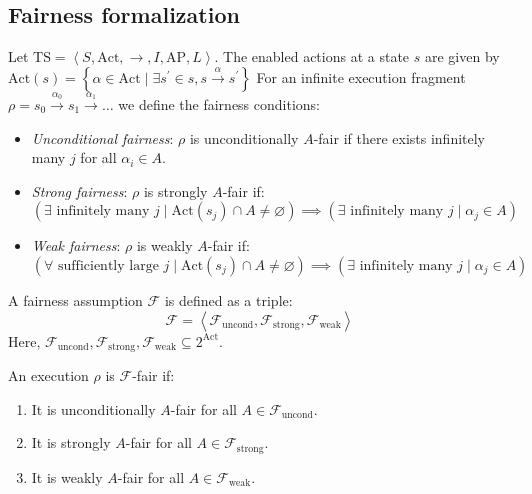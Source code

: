 \subsection{Fairness formalization}
\begin{definition}
    Let $\text{TS}=\left\langle S,\text{Act},\rightarrow,I,\text{AP},L\right\rangle$. 
    The enabled actions at a state $s$ are given by $\text{Act}(s)=\left\{\alpha\in\text{Act}\mid\exists s^\prime \in s, s\xrightarrow{\alpha}s^\prime\right\}$
    For an infinite execution fragment $\rho=s_0\xrightarrow{\alpha_0}s_1\xrightarrow{\alpha_1}\dots$ we define the fairness conditions:
    \begin{itemize}
        \item \textit{Unconditional fairness}: $\rho$ is unconditionally $A$-fair if there exists infinitely many $j$ for all $\alpha_i\in A$. 
        \item \textit{Strong fairness}: $\rho$ is strongly $A$-fair if: 
            \[\left(\exists \text{ infinitely many }j\mid\text{Act}(s_j)\cap A\neq\varnothing\right)\implies\left(\exists \text{ infinitely many }j\mid\alpha_j\in A\right)\]
        \item \textit{Weak fairness}: $\rho$ is weakly $A$-fair if: 
            \[\left(\forall \text{ sufficiently large }j\mid\text{Act}(s_j)\cap A\neq\varnothing\right)\implies\left(\exists \text{ infinitely many }j\mid\alpha_j\in A\right)\]
    \end{itemize}
\end{definition}
\begin{definition}
    A fairness assumption $\mathcal{F}$  is defined as a triple: 
    \[\mathcal{F}=\left\langle \mathcal{F}_{\text{uncond}},\mathcal{F}_{\text{strong}},\mathcal{F}_{\text{weak}}\right\rangle\] 
    Here, $\mathcal{F}_{\text{uncond}},\mathcal{F}_{\text{strong}},\mathcal{F}_{\text{weak}}\subseteq 2^{\text{Act}}$. 
\end{definition}
\noindent An execution $\rho$ is $\mathcal{F}$-fair if: 
\begin{enumerate}
    \item It is unconditionally $A$-fair for all $A \in \mathcal{F}_{\text{uncond}}$.
    \item It is strongly $A$-fair for all $A \in \mathcal{F}_{\text{strong}}$.
    \item It is weakly $A$-fair for all $A \in \mathcal{F}_{\text{weak}}$.
\end{enumerate}

